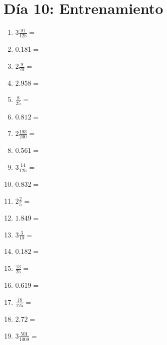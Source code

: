 \documentclass[12pt]{article}
\begin{document}
\section*{Día 10: Entrenamiento}
\begin{enumerate}
\item \large $ 3 \frac{91}{125} = $ \vspace{1.5cm}
\item \large $ 0.181 = $ \vspace{1.5cm}
\item \large $ 2 \frac{9}{20} = $ \vspace{1.5cm}
\item \large $ 2.958 = $ \vspace{1.5cm}
\item \large $ \frac{8}{25} = $ \vspace{1.5cm}
\item \large $ 0.812 = $ \vspace{1.5cm}
\item \large $ 2 \frac{193}{200} = $ \vspace{1.5cm}
\item \large $ 0.561 = $ \vspace{1.5cm}
\item \large $ 3 \frac{14}{125} = $ \vspace{1.5cm}
\item \large $ 0.832 = $ \vspace{1.5cm}
\newpage
\item \large $ 2 \frac{2}{5} = $ \vspace{1.5cm}
\item \large $ 1.849 = $ \vspace{1.5cm}
\item \large $ 3 \frac{3}{10} = $ \vspace{1.5cm}
\item \large $ 0.182 = $ \vspace{1.5cm}
\item \large $ \frac{13}{25} = $ \vspace{1.5cm}
\item \large $ 0.619 = $ \vspace{1.5cm}
\item \large $ \frac{18}{125} = $ \vspace{1.5cm}
\item \large $ 2.72 = $ \vspace{1.5cm}
\item \large $ 3 \frac{501}{1000} = $ \vspace{1.5cm}

\end{enumerate}
\end{document}
